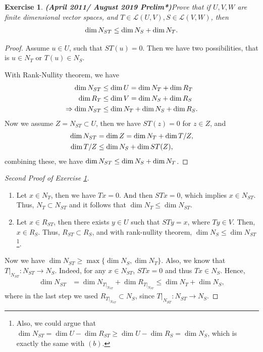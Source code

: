 \documentclass[11pt]{book}
\newtheorem{exercise}{Exercise}[section]
\theoremstyle{definition}
\numberwithin{equation}{chapter}
\begin{document}
\medskip

\begin{exercise}{\bf (April 2011/ August 2019 Prelim*)}\label{April_2011_p1}
Prove that if $U,V,W$ are finite dimensional vector spaces, and $T\in\mathscr{L}(U,V), S\in\mathscr{L}(V,W)$, then
\begin{align*}
    {\rm dim}\, N_{ST} \leq {\rm dim}\, N_S + {\rm dim}\, N_T.
\end{align*}
\end{exercise}
\begin{proof}
Assume $u\in U$, such that $ST(u) = 0$. Then we have two possibilities, that is $u\in N_T$ or $T(u)\in N_S$.

With Rank-Nullity theorem, we have 
\begin{align*}
    {\rm dim}\, N_{ST} & \leq {\rm dim}\, U = {\rm dim}\, N_T + {\rm dim}\, R_T \\
    {\rm dim}\, R_T & \leq {\rm dim}\, V = {\rm dim}\, N_S + {\rm dim}\, R_S\\
    \Rightarrow {\rm dim}\, N_{ST} & \leq {\rm dim}\, N_T + {\rm dim}\, N_S + {\rm dim}\, R_S.
\end{align*}
Now we assume $Z = N_{ST}\subset U$, then we have $ST(z) = 0$  for $z\in Z$, and 
\begin{align*}
    {\rm dim}\, N_{ST} & = {\rm dim}\, Z = {\rm dim}\, N_T + {\rm dim}\, T/Z, \\
    {\rm dim}\, T/Z & \leq {\rm dim}\, N_S + {\rm dim}\, ST(Z),
\end{align*}
combining these, we have ${\rm dim}\, N_{ST} \leq {\rm dim}\, N_S + {\rm dim}\, N_T$.
\end{proof}

\medskip

\begin{proof}[Second Proof of Exercise \ref{April_2011_p1}]
~\begin{enumerate}[label=(\alph*)]
    \item Let $x \in N_T$, then we have $Tx = 0$. And then $STx = 0$, which implies $x \in N_{ST}$. Thus, $N_{T} \subset N_{ST}$ and it follows that $\dim N_T \leq \dim N_{ST}$.
    
    \item Let $x \in R_{ST}$, then there exists $y \in U$ such that $STy = x$, where $Ty \in V$. Then, $x \in R_S$. Thus, $R_{ST} \subset R_S$, and with rank-nullity theorem, $\dim N_S \leq \dim N_{ST}$\footnote{Also, we could argue that $\dim N_{ST} = \dim U - \dim R_{ST} \geq \dim U - \dim R_S = \dim N_S$, which is exactly the same with $(b)$\cite{9}.}.
\end{enumerate}
Now we have $\dim N_{ST} \geq \max \{\dim N_S, \dim N_T\}$. Also, we know that $T|_{N_{ST}}: N_{ST} \to N_S$. Indeed, for any $x \in N_{ST}$, $STx = 0$ and thus $Tx \in N_S$. Hence,
\begin{align*}
    \dim N_{ST} & = \dim N_{T|_{N_{ST}}} + \dim R_{T|_{N_{ST}}} \leq \dim N_T + \dim N_S,
\end{align*}
where in the last step we used $R_{T|_{N_{ST}}} \subset N_S$, since $T|_{N_{ST}}: N_{ST} \to N_S$.
\end{proof}
\end{document}
